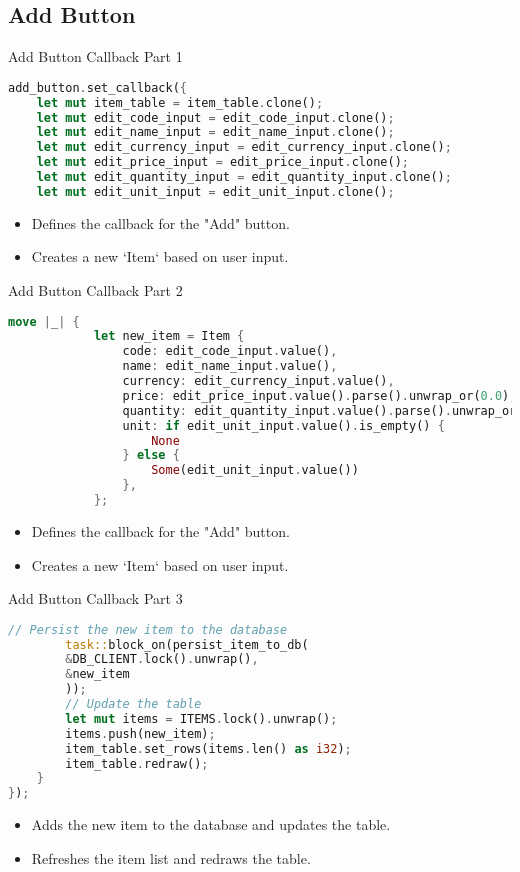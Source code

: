 \documentclass[aspectratio=169, table]{beamer}
\begin{document}
\subsection{Add Button}
\begin{frame}[fragile]{Add Button Callback Part 1}
\begin{lstlisting}[language=Rust]
add_button.set_callback({
	let mut item_table = item_table.clone();
	let mut edit_code_input = edit_code_input.clone();
	let mut edit_name_input = edit_name_input.clone();
	let mut edit_currency_input = edit_currency_input.clone();
	let mut edit_price_input = edit_price_input.clone();
	let mut edit_quantity_input = edit_quantity_input.clone();
	let mut edit_unit_input = edit_unit_input.clone();
	\end{lstlisting}
	
	\begin{itemize}
		\item Defines the callback for the "Add" button.
		\item Creates a new `Item` based on user input.
	\end{itemize}
\end{frame}

\begin{frame}[fragile]{Add Button Callback Part 2}
\begin{lstlisting}[language=Rust]
		move |_| {
			let new_item = Item {
				code: edit_code_input.value(),
				name: edit_name_input.value(),
				currency: edit_currency_input.value(),
				price: edit_price_input.value().parse().unwrap_or(0.0),
				quantity: edit_quantity_input.value().parse().unwrap_or(0.0),
				unit: if edit_unit_input.value().is_empty() {
					None
				} else {
					Some(edit_unit_input.value())
				},
			};
		\end{lstlisting}
		
		\begin{itemize}
			\item Defines the callback for the "Add" button.
			\item Creates a new `Item` based on user input.
		\end{itemize}
	\end{frame}

\begin{frame}[fragile]{Add Button Callback Part 3}
	\begin{lstlisting}[language=Rust]
		// Persist the new item to the database
		task::block_on(persist_item_to_db(
		&DB_CLIENT.lock().unwrap(),
		&new_item
		));
		// Update the table
		let mut items = ITEMS.lock().unwrap();
		items.push(new_item);
		item_table.set_rows(items.len() as i32);
		item_table.redraw();
	}
});
\end{lstlisting}

\begin{itemize}
	\item Adds the new item to the database and updates the table.
	\item Refreshes the item list and redraws the table.
\end{itemize}
\end{frame}
\end{document}
